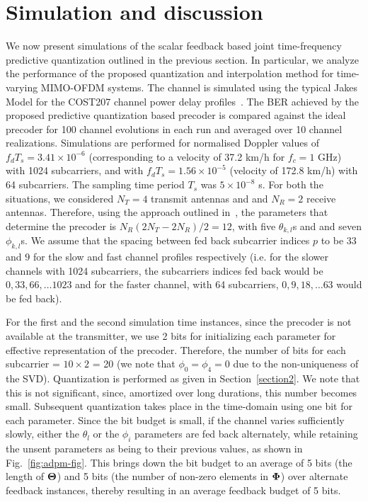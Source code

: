 \documentclass[journal,10pt,twocolumn]{IEEEtran}
\begin{document}
\section{Simulation and discussion}
\label{section3}
We now present simulations of the scalar feedback based joint
time-frequency predictive quantization outlined in the previous
section. In particular, we analyze the performance of the proposed
quantization and interpolation method for time-varying MIMO-OFDM
systems. The channel is simulated using the typical Jakes Model 
for the COST207 channel power delay
profiles~\cite{molisch2006cost259,cost1989cost}. The BER achieved by
the proposed predictive quantization based precoder is compared
against the ideal precoder for 100 channel evolutions in each run and
averaged over 10 channel realizations. Simulations are performed for
normalised Doppler values of $f_dT_s = 3.41\times 10^{-6}$ (corresponding
to a velocity of 37.2 km/h for $f_c = 1$ GHz) with 1024 subcarriers, and with
$f_dT_s = 1.56 \times 10^{-5}$ (velocity of 172.8 km/h) with 64
subcarriers. The sampling time period $T_s$ was $5\times10^{-8}$
s. For both the situations, we considered $N_T=4$ transmit antennas
and and $N_R=2$ receive antennas. Therefore, using the approach
outlined in~\cite{4114278}, the parameters that determine the precoder is
$N_{R}(2N_{T} - 2N_R )/2 = 12$, with five $\theta_{k,l}$s and and seven
$\phi_{k,l}$s. We assume that the spacing between fed back subcarrier
indices $p$ to be $33$ and $9$ for the slow and fast channel profiles
respectively (i.e. for the slower channels with 1024 subcarriers, the
subcarriers indices fed back would be $0, 33, 66, \ldots 1023$ and for
the faster channel, with 64 subcarriers, $0, 9, 18, \ldots 63$ would
be fed back).

For the first and the second simulation time instances, since the
precoder is not available at the transmitter, we use 2 bits for
initializing each parameter for effective representation of the
precoder. Therefore, the number of bits for each subcarrier =
$10\times 2$ = 20 (we note that $\phi_0 = \phi_4 = 0$ due to the
non-uniqueness of the SVD). Quantization is performed as given in
Section~\ref{section2}. We note that this is not significant, since,
amortized over long durations, this number becomes small. Subsequent
quantization takes place in the time-domain using one bit for each
parameter. Since the bit budget is small, if the channel varies
sufficiently slowly, either the $\theta_l$ or the $\phi_i$ parameters
are fed back alternately, while retaining the unsent parameters as
being to their previous values, as shown in
Fig.~\ref{fig:adpm-fig}.
This brings down the bit budget to an average of 5 bits (the length of
$\bf{\Theta}$) and 5 bits (the number of non-zero elements in
$\bf{\Phi}$) over alternate feedback instances, thereby resulting in
an average feedback budget of 5 bits.
\end{document}
